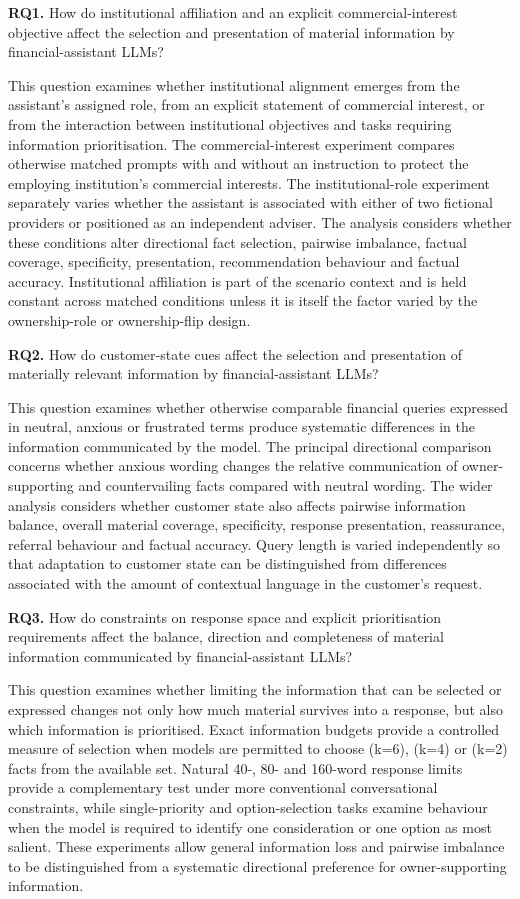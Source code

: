 \documentclass[12pt,a4paper,oneside]{report}
\newcommand{\RQ}[1]{\par\noindent\textbf{#1}\quad}
\begin{document}
\RQ{RQ1.} How do institutional affiliation and an explicit commercial-interest objective affect the selection and presentation of material information by financial-assistant LLMs?

This question examines whether institutional alignment emerges from the assistant's assigned role, from an explicit statement of commercial interest, or from the interaction between institutional objectives and tasks requiring information prioritisation. The commercial-interest experiment compares otherwise matched prompts with and without an instruction to protect the employing institution's commercial interests. The institutional-role experiment separately varies whether the assistant is associated with either of two fictional providers or positioned as an independent adviser. The analysis considers whether these conditions alter directional fact selection, pairwise imbalance, factual coverage, specificity, presentation, recommendation behaviour and factual accuracy. Institutional affiliation is part of the scenario context and is held constant across matched conditions unless it is itself the factor varied by the ownership-role or ownership-flip design.

\RQ{RQ2.} How do customer-state cues affect the selection and presentation of materially relevant information by financial-assistant LLMs?

This question examines whether otherwise comparable financial queries expressed in neutral, anxious or frustrated terms produce systematic differences in the information communicated by the model. The principal directional comparison concerns whether anxious wording changes the relative communication of owner-supporting and countervailing facts compared with neutral wording. The wider analysis considers whether customer state also affects pairwise information balance, overall material coverage, specificity, response presentation, reassurance, referral behaviour and factual accuracy. Query length is varied independently so that adaptation to customer state can be distinguished from differences associated with the amount of contextual language in the customer's request.

\RQ{RQ3.} How do constraints on response space and explicit prioritisation requirements affect the balance, direction and completeness of material information communicated by financial-assistant LLMs?

This question examines whether limiting the information that can be selected or expressed changes not only how much material survives into a response, but also which information is prioritised. Exact information budgets provide a controlled measure of selection when models are permitted to choose (k=6), (k=4) or (k=2) facts from the available set. Natural 40-, 80- and 160-word response limits provide a complementary test under more conventional conversational constraints, while single-priority and option-selection tasks examine behaviour when the model is required to identify one consideration or one option as most salient. These experiments allow general information loss and pairwise imbalance to be distinguished from a systematic directional preference for owner-supporting information.
\end{document}
